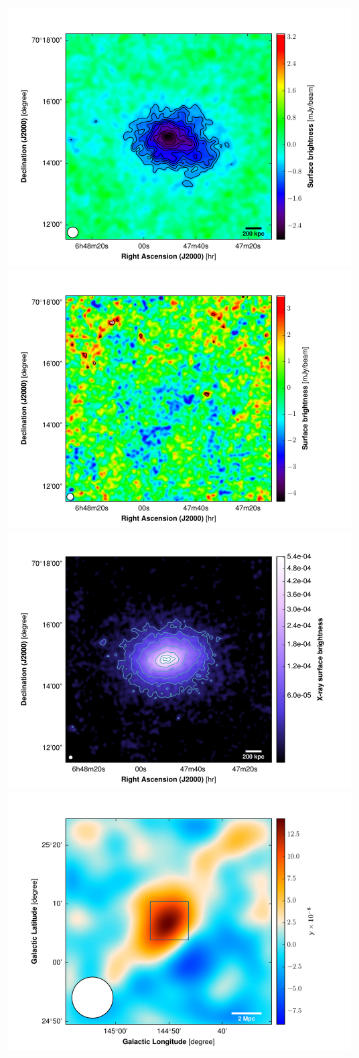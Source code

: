 \documentclass[traditabstract]{aa}
\begin{document}
\begin{figure}
\centering
\includegraphics[height=6.8cm]{NIKA2_PSZ2G144_2mm.pdf}
\includegraphics[height=6.8cm]{NIKA2_PSZ2G144_1mm.pdf}
\includegraphics[height=6.8cm]{XMM_map.pdf}
\includegraphics[height=6.8cm]{Planck_PSZ2G144bis.pdf}

\end{figure}
\end{document}
